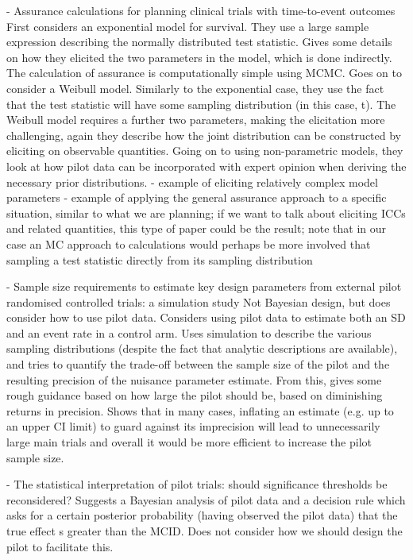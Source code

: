 \documentclass{article} %
\begin{document}
\cite{Ren2014} - Assurance calculations for planning clinical trials with time-to-event outcomes
First considers an exponential model for survival. They use a large sample expression describing the normally distributed test statistic. Gives some details on how they elicited the two parameters in the model, which is done indirectly. The calculation of assurance is computationally simple using MCMC. Goes on to consider a Weibull model. Similarly to the exponential case, they use the fact that the test statistic will have some sampling distribution (in this case, t). The Weibull model requires a further two parameters, making the elicitation more challenging, again they describe how the joint distribution can be constructed by eliciting on observable quantities. Going on to using non-parametric models, they look at how pilot data can be incorporated with expert opinion when deriving the necessary prior distributions.
- example of eliciting relatively complex model parameters
- example of applying the general assurance approach to a specific situation, similar to what we are planning; if we want to talk about eliciting ICCs and related quantities, this type of paper could be the result; note that in our case an MC approach to calculations would perhaps be more involved that sampling a test statistic directly from its sampling distribution

\cite{Teare2014} - Sample size requirements to estimate key design parameters from external pilot randomised controlled trials: a simulation study
Not Bayesian design, but does consider how to use pilot data. Considers using pilot data to estimate both an SD and an event rate in a control arm. Uses simulation to describe the various sampling distributions (despite the fact that analytic descriptions are available), and tries to quantify the trade-off between the sample size of the pilot and the resulting precision of the nuisance parameter estimate. From this, gives some rough guidance based on how large the pilot should be, based on diminishing returns in precision. Shows that in many cases, inflating an estimate (e.g. up to an upper CI limit) to guard against its imprecision will lead to unnecessarily large main trials and overall it would be more efficient to increase the pilot sample size.

\cite{Lee2014} - The statistical interpretation of pilot trials: should significance thresholds be reconsidered?
Suggests a Bayesian analysis of pilot data and a decision rule which asks for a certain posterior probability (having observed the pilot data) that the true effect s greater than the MCID. Does not consider how we should design the pilot to facilitate this.
\end{document}
